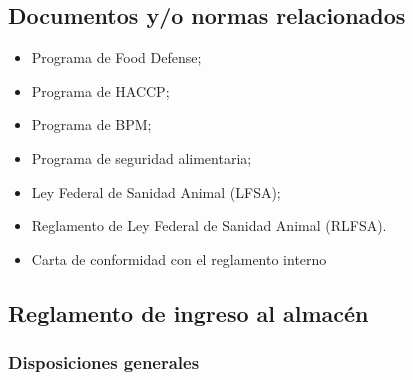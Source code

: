 \subsection{Documentos y/o normas relacionados}

\begin{itemize}
	\item Programa de Food Defense;
	\item Programa de HACCP;
	\item Programa de BPM;
	\item Programa de seguridad alimentaria;
	\item Ley Federal de Sanidad Animal (LFSA);
	\item Reglamento de Ley Federal de Sanidad Animal (RLFSA).
	\item Carta de conformidad con el reglamento interno
\end{itemize}

\subsection{Reglamento de ingreso al almacén}

\subsubsection{Disposiciones generales}

